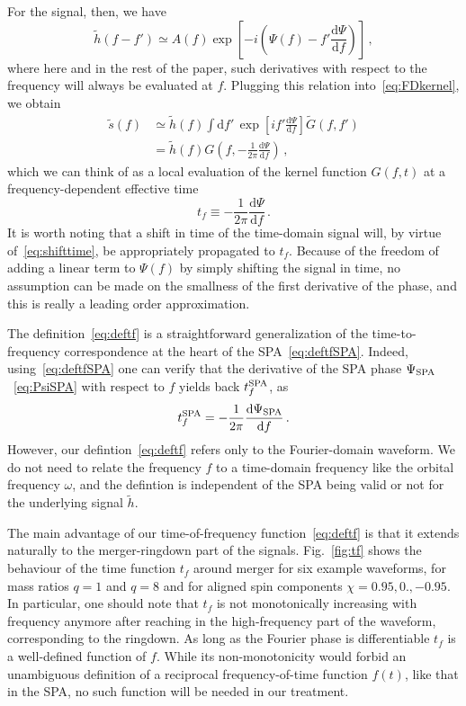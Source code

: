 \documentclass[aps,showpacs,twocolumn,
prd,superscriptaddress,nofootinbib]{revtex4-1}
\newcommand{\be}{\begin{equation}}
\newcommand{\ee}{\end{equation}}
\newcommand\ud{{\mathrm{d}}}
\newcommand{\nn}{\nonumber}
\newcommand{\tf}{t_{f}}
\newcommand{\tfSPA}{t_{f}^{\rm SPA}}
\begin{document}
For the signal, then, we have
\be
	\tilde{h}(f-f') \simeq A(f) \exp\left[ -i\left( \Psi(f) - f' \frac{\ud \Psi}{\ud f} \right) \right] \,,\label{eq:leadingorderwf}
\ee
where here and in the rest of the paper, such derivatives with respect to the frequency will always be evaluated at $f$. Plugging this relation into~\eqref{eq:FDkernel}, we obtain
\begin{align}
	\tilde{s}(f) &\simeq \tilde{h}(f) \int \ud f' \, \exp\left[ i f' \frac{\ud \Psi}{\ud f} \right] \tilde{G}(f,f') \nn\\
	&= \tilde{h}(f) G\left( f, -\frac{1}{2\pi} \frac{\ud \Psi}{\ud f} \right) \,,\label{eq:leadingorderresponse}
\end{align}
which we can think of as a local evaluation of the kernel function $G(f,t)$ at a frequency-dependent effective time
\be\label{eq:deftf}
	\tf \equiv -\frac{1}{2\pi} \frac{\ud \Psi}{\ud f} \,.
\ee
It is worth noting that a shift in time of the time-domain signal will, by virtue of~\eqref{eq:shifttime}, be appropriately propagated to $t_{f}$. Because of the freedom of adding a linear term to $\Psi(f)$ by simply shifting the signal in time, no assumption can be made on the smallness of the first derivative of the phase, and this is really a leading order approximation.

The definition~\eqref{eq:deftf} is a straightforward generalization of the time-to-frequency correspondence at the heart of the SPA~\eqref{eq:deftfSPA}. Indeed, using~\eqref{eq:deftfSPA} one can verify that the derivative of the SPA phase $\Psi_{\rm SPA}$~\eqref{eq:PsiSPA} with respect to $f$ yields back $\tfSPA$, as
\be\label{eq:tfSPA}
	\tfSPA = -\frac{1}{2\pi} \frac{\ud \Psi_{\rm SPA}}{\ud f} \,.
\ee
However, our defintion~\eqref{eq:deftf} refers only to the Fourier-domain waveform. We do not need to relate the frequency $f$ to a time-domain frequency like the orbital frequency $\omega$, and the defintion is independent of the SPA being valid or not for the underlying signal $\tilde{h}$.

The main advantage of our time-of-frequency function~\eqref{eq:deftf} is that it extends naturally to the merger-ringdown part of the signals. Fig.~\ref{fig:tf} shows the behaviour of the time function $\tf$ around merger for six example waveforms, for mass ratios $q=1$ and $q=8$ and for aligned spin components $\chi=0.95,0.,-0.95$. In particular, one should note that $\tf$ is not monotonically increasing with frequency anymore after reaching in the high-frequency part of the waveform, corresponding to the ringdown. As long as the Fourier phase is differentiable $t_{f}$ is a well-defined function of $f$. While its non-monotonicity would forbid an unambiguous definition of a reciprocal frequency-of-time function $f(t)$, like that in the SPA, no such function will be needed in our treatment.
\end{document}

